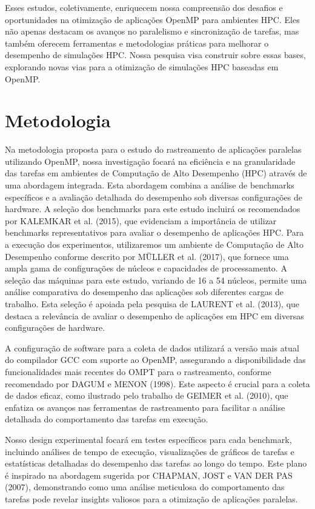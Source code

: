 \documentclass[ppgc,diss]{iiufrgs}
\begin{document}
Esses estudos, coletivamente, enriquecem nossa compreensão dos desafios e oportunidades na otimização de aplicações OpenMP para ambientes HPC. Eles não apenas destacam os avanços no paralelismo e sincronização de tarefas, mas também oferecem ferramentas e metodologias práticas para melhorar o desempenho de simulações HPC. Nossa pesquisa visa construir sobre essas bases, explorando novas vias para a otimização de simulações HPC baseadas em OpenMP.



\section{Metodologia}

Na metodologia proposta para o estudo do rastreamento de aplicações paralelas utilizando OpenMP, nossa investigação focará na eficiência e na granularidade das tarefas em ambientes de Computação de Alto Desempenho (HPC) através de uma abordagem integrada. Esta abordagem combina a análise de benchmarks específicos e a avaliação detalhada do desempenho sob diversas configurações de hardware. A seleção dos benchmarks para este estudo incluirá os recomendados por KALEMKAR et al. (2015), que evidenciam a importância de utilizar benchmarks representativos para avaliar o desempenho de aplicações HPC.
Para a execução dos experimentos, utilizaremos um ambiente de Computação de Alto Desempenho conforme descrito por MÜLLER et al. (2017), que fornece uma ampla gama de configurações de núcleos e capacidades de processamento. A seleção das máquinas para este estudo, variando de 16 a 54 núcleos, permite uma análise comparativa do desempenho das aplicações sob diferentes cargas de trabalho. Esta seleção é apoiada pela pesquisa de LAURENT et al. (2013), que destaca a relevância de avaliar o desempenho de aplicações em HPC em diversas configurações de hardware.

A configuração de software para a coleta de dados utilizará a versão mais atual do compilador GCC com suporte ao OpenMP, assegurando a disponibilidade das funcionalidades mais recentes do OMPT para o rastreamento, conforme recomendado por DAGUM e MENON (1998). Este aspecto é crucial para a coleta de dados eficaz, como ilustrado pelo trabalho de GEIMER et al. (2010), que enfatiza os avanços nas ferramentas de rastreamento para facilitar a análise detalhada do comportamento das tarefas em execução.


Nosso design experimental focará em testes específicos para cada benchmark, incluindo análises de tempo de execução, visualizações de gráficos de tarefas e estatísticas detalhadas do desempenho das tarefas ao longo do tempo. Este plano é inspirado na abordagem sugerida por CHAPMAN, JOST e VAN DER PAS (2007), demonstrando como uma análise meticulosa do comportamento das tarefas pode revelar insights valiosos para a otimização de aplicações paralelas.
\end{document}
